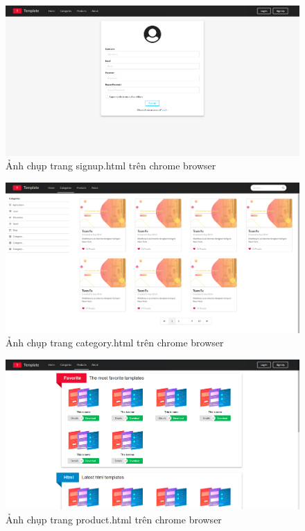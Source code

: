 \documentclass[a4paper]{article}
\begin{document}
\begin{figure}[H]
\begin{center}
\includegraphics[page=1, scale=0.215]{screenshot/chrome3.png}
\caption{Ảnh chụp trang signup.html trên chrome browser}
\end{center}
\end{figure}

\begin{figure}[H]
\begin{center}
\includegraphics[page=1, scale=0.215]{screenshot/chrome4.png}
\caption{Ảnh chụp trang category.html trên chrome browser}
\end{center}
\end{figure}

\begin{figure}[H]
\begin{center}
\includegraphics[page=1, scale=0.215]{screenshot/chrome5.png}
\caption{Ảnh chụp trang product.html trên chrome browser}
\end{center}
\end{figure}
\end{document}
